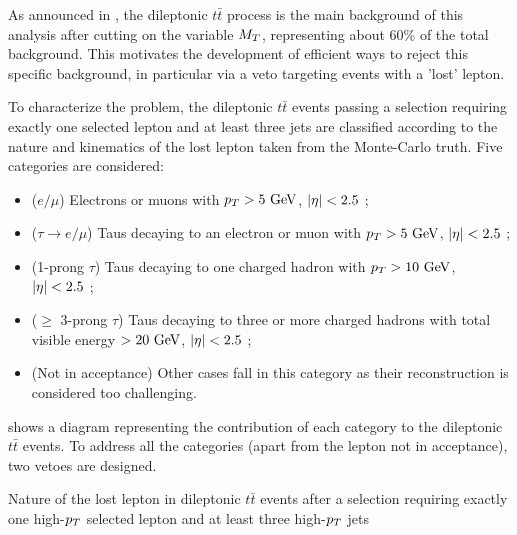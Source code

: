     As announced in , the dileptonic
    $t\bar{t}$ process is the main background of this analysis after cutting on
    the variable $M_T$, representing about 60\% of the total background.  This
    motivates the development of efficient ways to reject this specific
    background, in particular via a veto targeting events with a 'lost' lepton.

    To characterize the problem, the dileptonic $t\bar{t}$ events passing a
    selection requiring exactly one selected lepton and at least three jets are
    classified according to the nature and kinematics of the lost lepton taken
    from the Monte-Carlo truth. Five categories are considered:
    \begin{itemize}
        \item ($e/\mu$) Electrons or muons with $p_T > 5~\text{GeV}$, $\left| \eta \right| < 2.5$ ;
        \item ($\tau \rightarrow e/\mu$) Taus decaying to an electron or muon
            with $p_T > 5~\text{GeV}$, $\left| \eta \right| < 2.5$ ;
        \item (1-prong $\tau$) Taus decaying to one charged hadron with $p_T >
            10~\text{GeV}$, $\left| \eta \right| < 2.5$ ;
        \item ($\geq$ 3-prong $\tau$) Taus decaying to three or more charged
            hadrons with total visible energy $> 20~\text{GeV}$, $\left| \eta \right| < 2.5$ ;
        \item (Not in acceptance) Other cases fall in this category as their
            reconstruction is considered too challenging.
    \end{itemize}

     shows a diagram
    representing the contribution of each category to the dileptonic $t\bar{t}$
    events. To address all the categories (apart from the lepton not in
    acceptance), two vetoes are designed.

                 {Nature of the lost lepton in dileptonic $t\bar{t}$ events
                 after a selection requiring exactly one high-$p_T$ selected
                 lepton and at least three high-$p_T$ jets}

